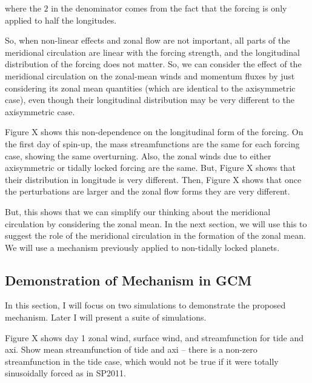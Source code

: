 where the $2$ in the denominator comes from the fact that the forcing is only applied to half the longitudes.

So, when non-linear effects and zonal flow are not important, all parts of the meridional circulation are linear with the forcing strength, and the longitudinal distribution of the forcing does not matter. So, we can consider the effect of the meridional circulation on the zonal-mean winds and momentum fluxes by just considering its zonal mean quantities (which are identical to the axisymmetric case), even though their longitudinal distribution may be very different to the axisymmetric case.

Figure X shows this non-dependence on the longitudinal form of the forcing. On the first day of spin-up, the mass streamfunctions are the same for each forcing case, showing the same overturning. Also, the zonal winds due to either axisymmetric or tidally locked forcing are the same. But, Figure X shows that their distribution in longitude is very different. Then, Figure X shows that once the perturbations are larger and the zonal flow forms they are very different.

But, this shows that we can simplify our thinking about the meridional circulation by considering the zonal mean. In the next section, we will use this to suggest the role of the meridional circulation in the formation of the zonal mean. We will use a mechanism previously applied to non-tidally locked planets.


\subsection{Demonstration of Mechanism in GCM}

In this section, I will focus on two simulations to demonstrate the proposed mechanism. Later I will present a suite of simulations.

Figure X shows day 1 zonal wind, surface wind, and streamfunction for tide and axi. Show mean streamfunction of tide and axi -- there is a non-zero streamfunction in the tide case, which would not be true if it were totally sinusoidally forced as in SP2011.


